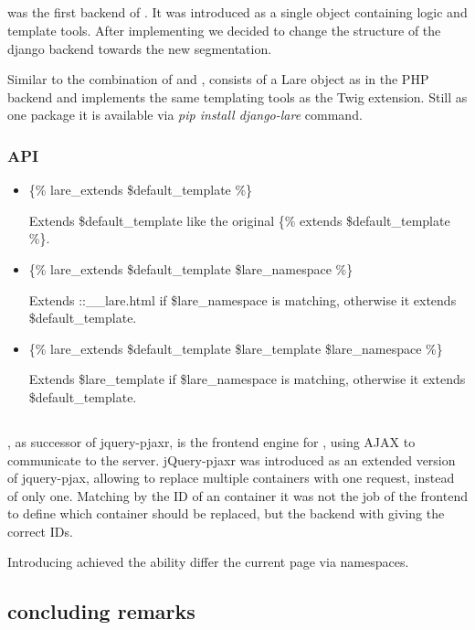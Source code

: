 \subsection{\djangoLare{}}

\djangoLare{} was the first backend of \lare{}.
It was introduced as a single object containing logic and template tools.
After implementing \phpLare{} we decided to change the structure of the django backend towards the new segmentation.

Similar to the combination of \phpLare{} and \twigLare{}, \djangoLare{} consists of a Lare object as in the PHP backend and implements the same templating tools as the Twig extension.
Still as one package it is available via \emph{pip install django-lare} command.


\subsubsection{API}

\begin{itemize}
\item \{\% lare\_extends \$default\_template \%\}

Extends \$default\_template like the original \{\% extends \$default\_template \%\}.
\item \{\% lare\_extends \$default\_template \$lare\_namespace \%\}

Extends ::\_\_lare.html if \$lare\_namespace is matching, otherwise it extends \$default\_template.
\item \{\% lare\_extends \$default\_template \$lare\_template \$lare\_namespace \%\}

Extends \$lare\_template if \$lare\_namespace is matching, otherwise it extends \$default\_template.
\end{itemize}

\subsection{\lareJS{}}
\lareJS{}, as successor of jquery-pjaxr, is the frontend engine for \lare{}, using AJAX to communicate to the server.
jQuery-pjaxr was introduced as an extended version of jquery-pjax, allowing to replace multiple containers with one request, instead of only one.
Matching by the ID of an container it was not the job of the frontend to define which container should be replaced, but the backend with giving the correct IDs.

Introducing \lareJS{} achieved the ability differ the current page via namespaces.


\subsection{concluding remarks}
